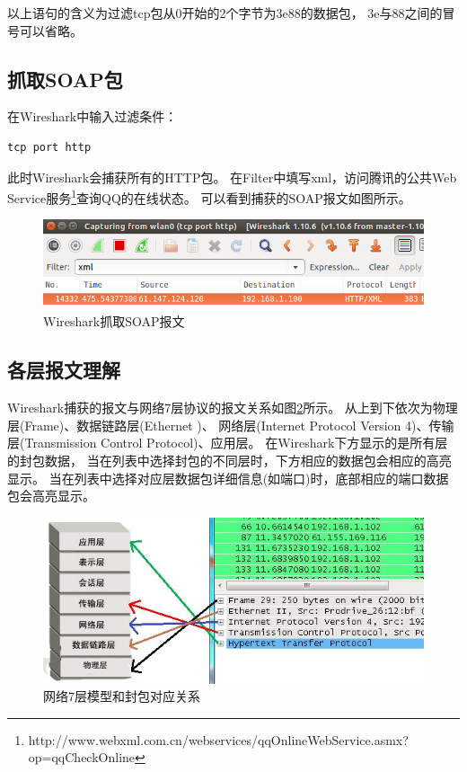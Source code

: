 \documentclass{book}
\begin{document}
以上语句的含义为过滤tcp包从0开始的2个字节为3e88的数据包，
3e与88之间的冒号可以省略。

\subsection{抓取SOAP包}

在Wireshark中输入过滤条件：

\begin{lstlisting}[language=Bash]
tcp port http
\end{lstlisting}

此时Wireshark会捕获所有的HTTP包。
在Filter中填写xml，访问腾讯的公共Web Service服务\footnote{http://www.webxml.com.cn/webservices/qqOnlineWebService.asmx?op=qqCheckOnline}查询QQ的在线状态。
可以看到捕获的SOAP报文如图所示。

\begin{figure}[htbp]
	\centering
	\includegraphics[scale=0.6]{WiresharkCaptureSoap.png}
	\caption{Wireshark抓取SOAP报文}
	\label{fig:WiresharkCaptureSoap}
\end{figure}

\subsection{各层报文理解}


Wireshark捕获的报文与网络7层协议的报文关系如图\ref{fig:SevenModelInWireshark}所示。
从上到下依次为物理层(Frame)、数据链路层(Ethernet \uppercase\expandafter{})、
网络层(Internet Protocol Version 4)、传输层(Transmission Control Protocol)、应用层。
在Wireshark下方显示的是所有层的封包数据，
当在列表中选择封包的不同层时，下方相应的数据包会相应的高亮显示。
当在列表中选择对应层数据包详细信息(如端口)时，底部相应的端口数据包会高亮显示。

\begin{figure}[htbp]
	\centering
	\includegraphics[scale=0.6]{SevenModelInWireshark.jpg}
	\caption{网络7层模型和封包对应关系}
	\label{fig:SevenModelInWireshark}
\end{figure}
\end{document}
